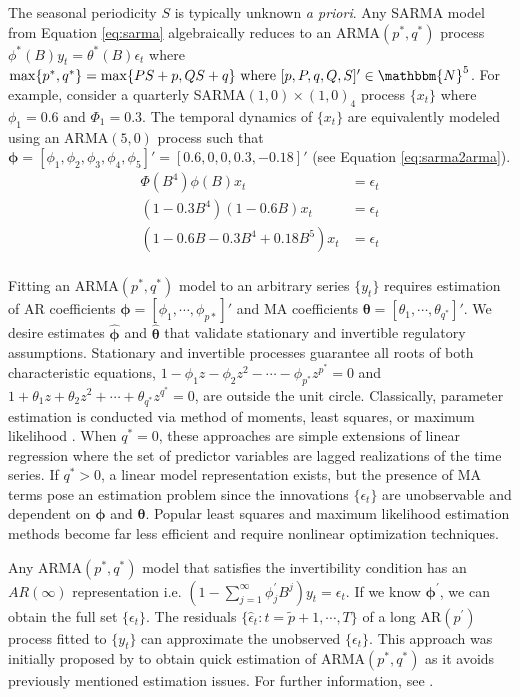 The seasonal periodicity $S$ is typically unknown \textit{a priori}. Any SARMA model from Equation \ref{eq:sarma} algebraically reduces to an ARMA$(p^*,q^*)$ process $\phi^*(B)y_t=\theta^*(B)\epsilon_t$ where $\max\{p^*,q^*\}=\max\{PS+p,QS+q\} \textrm{ where } [p,P,q,Q,S]'\in\mathbbm{N}^5$. For example, consider a quarterly SARMA$(1,0)\times(1,0)_{4}$ process $\{x_t\}$ where $\phi_1=0.6$ and $\Phi_1=0.3$. The temporal dynamics of $\{x_t\}$ are equivalently modeled using an ARMA$(5,0)$ process such that $\bm{\phi}=[\phi_1,\phi_2,\phi_3,\phi_4,\phi_5]'=[0.6,0,0,0.3,-0.18]'$ (see Equation \ref{eq:sarma2arma}).
\begin{equation}
\label{eq:sarma2arma}
\begin{split}
\Phi(B^4)\phi(B)x_t&=\epsilon_t\\
(1-0.3B^4)(1-0.6B)x_t&=\epsilon_t\\
(1-0.6B-0.3B^4+0.18B^5)x_t&=\epsilon_t\\
\end{split}
\end{equation}

Fitting an ARMA$(p^*,q^*)$ model to an arbitrary series $\{y_t\}$ requires estimation of AR coefficients $\bm{\phi}=[\phi_1,\cdots,\phi_{p*}]'$ and MA coefficients $\bm{\theta}=[\theta_1,\cdots,\theta_{q^*}]'$. We desire estimates $\hat{\bm{\phi} }$ and $\hat{\bm{\theta} }$ that validate stationary and invertible regulatory assumptions. Stationary and invertible processes guarantee all roots of both characteristic equations, $1-\phi_1z-\phi_2z^2-\cdots -\phi_{p^*}z^{p^*}=0$ and $1+\theta_1z+\theta_2z^2+\cdots +\theta_{q^*}z^{q^*}=0$, are outside the unit circle. Classically, parameter estimation is conducted via method of moments, least squares, or maximum likelihood \citep{Hamilton1994, Cryer2008}. When $q^*=0$, these approaches are simple extensions of linear regression where the set of predictor variables are lagged realizations of the time series. If $q^*>0$, a linear model representation exists, but the presence of MA terms pose an estimation problem since the innovations $\{\epsilon_t\}$ are unobservable and dependent on $\bm{\phi}$ and $\bm{\theta}$. Popular least squares and maximum likelihood estimation methods become far less efficient and require nonlinear optimization techniques.

Any ARMA$(p^*,q^*)$ model that satisfies the invertibility condition has an $AR(\infty)$ representation i.e. $(1-\sum\limits_{j=1}^\infty \phi^\prime_jB^j)y_t=\epsilon_t$. If we know $\bm{\phi}^\prime$, we can obtain the full set $\{\epsilon_t\}$. The residuals $\{\hat{\epsilon}_t: t=\tilde{p}+1,\cdots,T\}$ of a long AR$(p^\prime)$ process fitted to  $\{y_t\}$ can approximate the unobserved $\{\epsilon_t\}$.  This approach was initially proposed by \cite{Hannan1982} to obtain quick estimation of ARMA$(p^*,q^*)$ as it avoids previously mentioned estimation issues. For further information, see \cite{Brockwell2016}.

